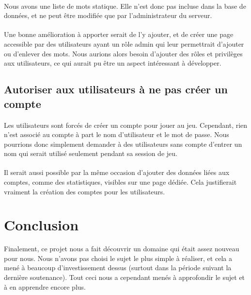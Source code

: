 \documentclass[11pt,a4paper]{article}
\begin{document}
            \paragraph{}
            Nous avons une liste de mots statique.
            Elle n'est donc pas incluse dans la base de données,
            et ne peut être modifiée que par l'administrateur du serveur.
            \paragraph{}
            Une bonne amélioration à apporter serait de l'y ajouter,
            et de créer une page accessible par des utilisateurs ayant un rôle admin qui leur permettrait d'ajouter ou d'enlever des mots.
            Nous aurions alors besoin d'ajouter des rôles et privilèges aux utilisateurs,
            ce qui aurait pu être un aspect intéressant à développer.
        \subsection*{Autoriser aux utilisateurs à ne pas créer un compte}
            \paragraph{}
            Les utilisateurs sont forcés de créer un compte pour jouer au jeu.
            Cependant, rien n'est associé au compte à part le nom d'utilisateur et le mot de passe.
            Nous pourrions donc simplement demander à des utilisateurs sans compte d'entrer un nom
            qui serait utilisé seulement pendant sa session de jeu.
            \paragraph{}
            Il serait aussi possible par la même occasion d'ajouter des données liées aux comptes,
            comme des statistiques, visibles sur une page dédiée.
            Cela justifierait vraiment la création des comptes pour les utilisateurs.
    \section{Conclusion}
        \paragraph{}
        Finalement, ce projet nous a fait découvrir un domaine qui était assez nouveau pour nous.
        Nous n'avons pas choisi le sujet le plus simple à réaliser,
        et cela a mené à beaucoup d'investissement dessus (surtout dans la période suivant la dernière soutenance).
        Tout ceci nous a cependant menés à approfondir le sujet et à en apprendre encore plus.
\end{document}
